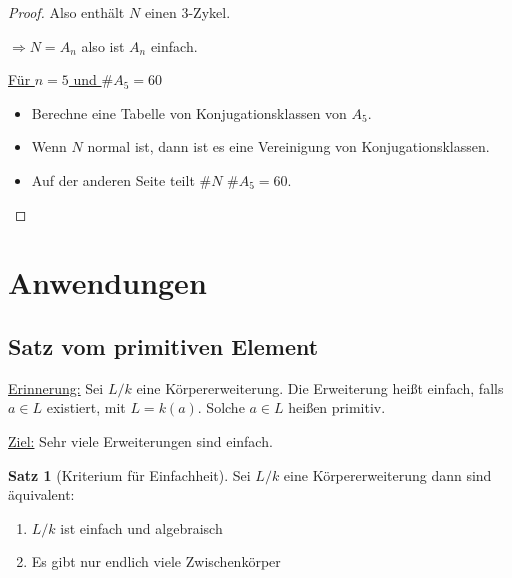 \documentclass[12pt,parskip=full]{scrartcl}
\newcommand{\heading}{\underline}
\theoremstyle{definition}
\newtheorem{theorem}{Satz}[section]
\theoremstyle{remark}
\begin{document}
\begin{proof}
		Also enthält $N$ einen $3$-Zykel.
		
		$\Rightarrow N = A_n$ also ist $A_n$ einfach.
		
		\heading{Für $n=5$ und $\#A_5 = 60$}
		\begin{itemize}
			\item Berechne eine Tabelle von Konjugationsklassen von $A_5$.
			\item Wenn $N$ normal ist, dann ist es eine Vereinigung von Konjugationsklassen.
			\item Auf der anderen Seite teilt $\#N$ $\#A_5 = 60$.
		\end{itemize}
	\end{proof}

	\section{Anwendungen}
	
	\subsection{Satz vom primitiven Element}
	
	\heading{Erinnerung:} Sei $L/k$ eine Körpererweiterung. Die Erweiterung heißt einfach, falls $a \in L$ existiert, mit $L = k(a)$. Solche $a \in L$ heißen primitiv.
	
	\heading{Ziel:} Sehr viele Erweiterungen sind einfach.
	
	\begin{theorem}[Kriterium für Einfachheit]
		Sei $L/k$ eine Körpererweiterung dann sind äquivalent:
		\begin{enumerate}
			\item $L/k$ ist einfach und algebraisch
			\item Es gibt nur endlich viele Zwischenkörper
		\end{enumerate}
	\end{theorem}
\end{document}
